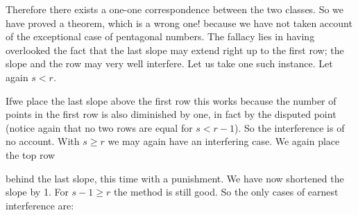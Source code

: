 Therefore there exists a one-one correspondence between the two
classes. So we have proved a theorem, which is a wrong one! because we
have not taken account of the exceptional case of pentagonal
numbers. The fallacy lies in having overlooked the fact that the last
slope may extend right up to the first row; the slope and the row may
very well interfere. Let us take one such instance. Let again $s< r$.
  \begin{figure}[H]
  \end{figure}

If\pageoriginale  we place the last slope above the first row this works because the
number of points in the first row is also diminished by one, in fact
by the disputed point (notice again that no two rows are equal for $s<
r-1$). So the interference is of no account. With $s \geq r$ we may
again have an interfering case. We again place the top row
  \begin{figure}[H]
  \end{figure}
\noindent behind the last slope, this time with a punishment. We have now
shortened the slope by 1. For $s-1\geq r$ the method is still good. So
the only cases of earnest interference are:

